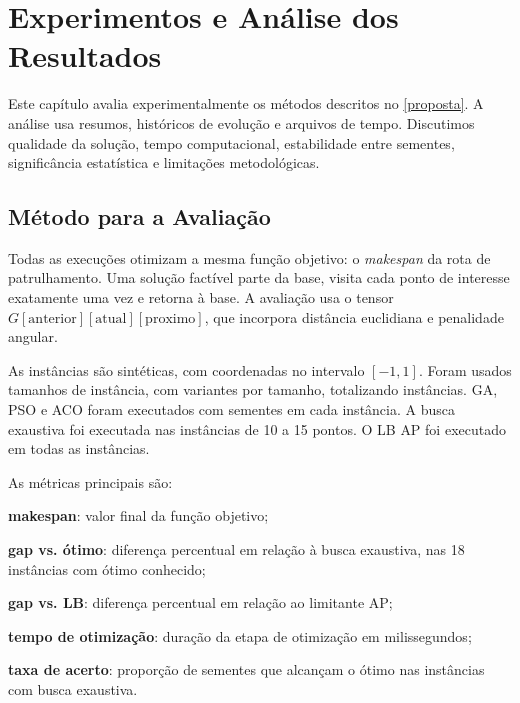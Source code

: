 \chapter[Experimentos e Análise dos Resultados]{Experimentos e Análise dos Resultados}
\label{experimentos}

Este capítulo avalia experimentalmente os métodos descritos no \autoref{proposta}. A análise usa \TotalArquivosResumo{} resumos, \TotalArquivosEvolucao{} históricos de evolução e \TotalArquivosTempo{} arquivos de tempo. Discutimos qualidade da solução, tempo computacional, estabilidade entre sementes, significância estatística e limitações metodológicas.

\section{Método para a Avaliação}
\label{metodo}

Todas as execuções otimizam a mesma função objetivo: o \textit{makespan} da rota de patrulhamento. Uma solução factível parte da base, visita cada ponto de interesse exatamente uma vez e retorna à base. A avaliação usa o tensor $G[\text{anterior}][\text{atual}][\text{proximo}]$, que incorpora distância euclidiana e penalidade angular.

As instâncias são sintéticas, com coordenadas no intervalo $[-1,1]$. Foram usados \TotalTamanhosInstancia{} tamanhos de instância, com \TotalVariantesPorTamanho{} variantes por tamanho, totalizando \TotalInstancias{} instâncias. \ac{GA}, \ac{PSO} e \ac{ACO} foram executados com \TotalSementesGA{} sementes em cada instância. A busca exaustiva foi executada nas \TotalInstanciasComOtimo{} instâncias de 10 a 15 pontos. O \ac{LB} \ac{AP} foi executado em todas as \TotalInstancias{} instâncias.

As métricas principais são:
\begin{alineas}
  \item \textbf{makespan}: valor final da função objetivo;
  \item \textbf{gap vs. ótimo}: diferença percentual em relação à busca exaustiva, nas 18 instâncias com ótimo conhecido;
  \item \textbf{gap vs. \ac{LB}}: diferença percentual em relação ao limitante \ac{AP};
  \item \textbf{tempo de otimização}: duração da etapa de otimização em milissegundos;
  \item \textbf{taxa de acerto}: proporção de sementes que alcançam o ótimo nas instâncias com busca exaustiva.
\end{alineas}

